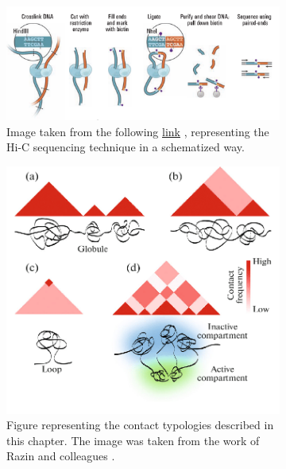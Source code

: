 \begin{figure}[H]
    \centering
    \begin{subfigure}{0.70\textwidth}
        \includegraphics[width=\linewidth]{./images/HiC-seq.png}
        \caption{Image taken from the following \href{https://data.4dnucleome.org/experiment-types/dilution-hi-c/}{link}
        \cite{lieberman-aidenComprehensiveMappingLong2009}, 
        representing the Hi-C sequencing technique in a schematized way.}
        \label{fig: HiC sequencing}
    \end{subfigure}
    \hfill
    \begin{subfigure}{0.57\textwidth}
      \includegraphics[width=\linewidth]{./images/HiC-contacts.png}
      \caption{Figure representing the contact typologies described in this chapter. The image was taken from the work of Razin and colleagues
      \cite{razin3DGenomics2019}.}
      \label{fig:RMSD collective replicates}
    \end{subfigure}
  
    \caption{}
\end{figure}

